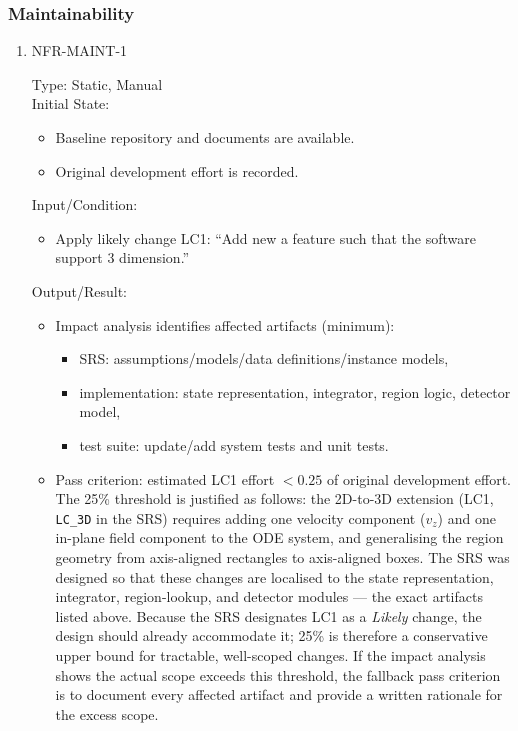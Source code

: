 \documentclass[12pt, titlepage]{article}
\begin{document}
\subsubsection{Maintainability}


\begin{enumerate}

\item{NFR-MAINT-1\\}

Type: Static, Manual\\

Initial State:
\begin{itemize}
  \item Baseline repository and documents are available.
  \item Original development effort is recorded.
\end{itemize}

Input/Condition:
\begin{itemize}
  \item Apply likely change LC1: ``Add new a feature such that the software support 3 dimension.''
\end{itemize}

Output/Result:
\begin{itemize}
  \item Impact analysis identifies affected artifacts (minimum):
  \begin{itemize}
    \item SRS: assumptions/models/data definitions/instance models,
    \item implementation: state representation, integrator, region logic, detector model,
    \item test suite: update/add system tests and unit tests.
  \end{itemize}
  \item Pass criterion: estimated LC1 effort $< 0.25$ of original development effort.
        The 25\% threshold is justified as follows: the 2D-to-3D extension
        (LC1, \texttt{LC\_3D} in the SRS) requires adding one velocity component
        ($v_z$) and one in-plane field component to the ODE system, and
        generalising the region geometry from axis-aligned rectangles to
        axis-aligned boxes.  The SRS was designed so that these changes are
        localised to the state representation, integrator, region-lookup, and
        detector modules --- the exact artifacts listed above.  Because the SRS
        designates LC1 as a \emph{Likely} change, the design should already
        accommodate it; 25\% is therefore a conservative upper bound for
        tractable, well-scoped changes.
        If the impact analysis shows the actual scope exceeds this threshold,
        the fallback pass criterion is to document every affected artifact and
        provide a written rationale for the excess scope.
\end{itemize}


\end{enumerate}
\end{document}
